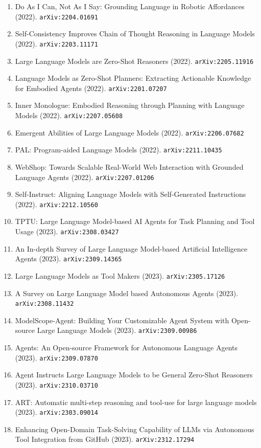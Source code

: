 \documentclass[11pt]{article}
\begin{document}
\begin{enumerate}
  \item Do As I Can, Not As I Say: Grounding Language in Robotic Affordances (2022). \texttt{arXiv:2204.01691}
  \item Self-Consistency Improves Chain of Thought Reasoning in Language Models (2022). \texttt{arXiv:2203.11171}
  \item Large Language Models are Zero-Shot Reasoners (2022). \texttt{arXiv:2205.11916}
  \item Language Models as Zero-Shot Planners: Extracting Actionable Knowledge
  for Embodied Agents (2022). \texttt{arXiv:2201.07207}
  \item Inner Monologue: Embodied Reasoning through Planning with Language
  Models (2022). \texttt{arXiv:2207.05608}
  \item Emergent Abilities of Large Language Models (2022). \texttt{arXiv:2206.07682}
  \item PAL: Program-aided Language Models (2022). \texttt{arXiv:2211.10435}
  \item WebShop: Towards Scalable Real-World Web Interaction with Grounded
  Language Agents (2022). \texttt{arXiv:2207.01206}
  \item Self-Instruct: Aligning Language Models with Self-Generated Instructions (2022). \texttt{arXiv:2212.10560}
  \item TPTU: Large Language Model-based AI Agents for Task Planning and Tool Usage (2023). \texttt{arXiv:2308.03427}
  \item An In-depth Survey of Large Language Model-based Artificial Intelligence
  Agents (2023). \texttt{arXiv:2309.14365}
  \item Large Language Models as Tool Makers (2023). \texttt{arXiv:2305.17126}
  \item A Survey on Large Language Model based Autonomous Agents (2023). \texttt{arXiv:2308.11432}
  \item ModelScope-Agent: Building Your Customizable Agent System with
  Open-source Large Language Models (2023). \texttt{arXiv:2309.00986}
  \item Agents: An Open-source Framework for Autonomous Language Agents (2023). \texttt{arXiv:2309.07870}
  \item Agent Instructs Large Language Models to be General Zero-Shot Reasoners (2023). \texttt{arXiv:2310.03710}
  \item ART: Automatic multi-step reasoning and tool-use for large language
  models (2023). \texttt{arXiv:2303.09014}
  \item Enhancing Open-Domain Task-Solving Capability of LLMs via Autonomous Tool Integration from GitHub (2023). \texttt{arXiv:2312.17294}

\end{enumerate}
\end{document}

